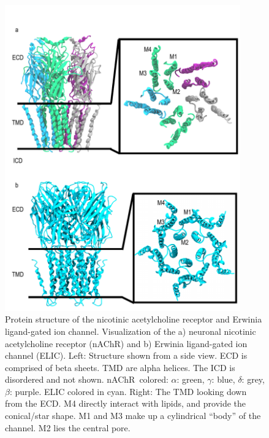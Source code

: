 \documentclass[12pt]{ruthesis_nofloat}
\newcommand{\nachr}{nAChR}
\begin{document}
\begin{figure}[!h]
	\center
	\includegraphics[width=4in]{pLGIC_Struct.pdf}
	\begin{flushleft}

	\caption[Protein structure of the nicotinic acetylcholine receptor and Erwinia ligand-gated ion channel.]{Protein structure of the nicotinic acetylcholine receptor and Erwinia ligand-gated ion channel. Visualization of  the a) neuronal nicotinic acetylcholine receptor (\nachr) \citep{Unwin2005} and b) Erwinia ligand-gated ion channel (ELIC). Left: Structure shown from a side view. ECD is comprised of beta sheets. TMD are alpha helices. The ICD is disordered and not shown.  \nachr~colored: $\alpha$: green, $\gamma$: blue, $\delta$: grey, $\beta$: purple. ELIC colored in cyan. Right: The TMD looking down from the ECD.   M4 directly interact with lipids, and provide the conical/star shape. M1 and M3 make up a cylindrical ``body'' of the channel. M2 lies the central pore.}
	\end{flushleft}

	\label{fig:struct}
\end{figure}
\end{document}
